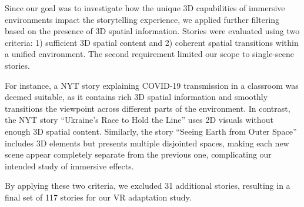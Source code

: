 Since our goal was to investigate how the unique 3D capabilities of immersive environments impact the storytelling experience, we applied further filtering based on the presence of 3D spatial information. Stories were evaluated using two criteria: 1) sufficient 3D spatial content and 2) coherent spatial transitions within a unified environment. 
{The second requirement limited our scope to single-scene stories.}

For instance, a NYT story explaining COVID-19 transmission in a classroom was deemed suitable, as it contains rich 3D spatial information and smoothly transitions the viewpoint across different parts of the environment. In contrast, the NYT story ``Ukraine's Race to Hold the Line'' uses 2D visuals without enough 3D spatial content. Similarly, the story ``Seeing Earth from Outer Space'' includes 3D elements but presents multiple disjointed spaces, making each new scene appear completely separate from the previous one, complicating our intended study of immersive effects.

By applying these two criteria, we excluded 31 additional stories, resulting in a final set of 117 stories for our VR adaptation study.


